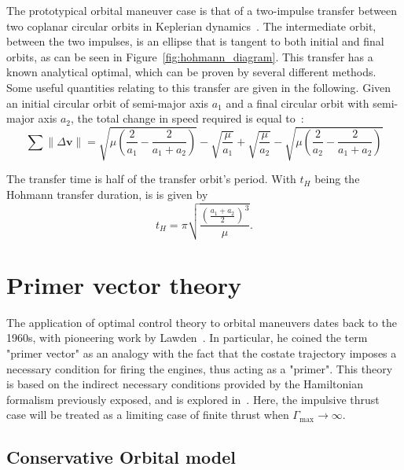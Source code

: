 The prototypical orbital maneuver case is that of a two-impulse transfer between two coplanar circular orbits in Keplerian dynamics~\cite{chobotov}. The intermediate orbit, between the two impulses, is an ellipse that is tangent to both initial and final orbits, as can be seen in Figure~\ref{fig:hohmann_diagram}. This transfer has a known analytical optimal, which can be proven by several different methods. Some useful quantities relating to this transfer are given in the following. Given an initial circular orbit of semi-major axis \(a_1\) and a final circular orbit with semi-major axis \(a_2\), the total change in speed required is equal to~\cite{chobotov}:
\begin{equation}\label{eq:hohmann_deltav}
    \sum \lVert \Delta \mathbf{v} \rVert = \sqrt{\mu\left(\frac{2}{a_1}-\frac{2}{a_1+a_2}\right)} - \sqrt{\frac{\mu}{a_1}} + \sqrt{\frac{\mu}{a_2}} - \sqrt{\mu\left(\frac{2}{a_2}-\frac{2}{a_1+a_2}\right)}
\end{equation}

The transfer time is half of the transfer orbit's period. With \(t_H\) being the Hohmann transfer duration, is is given by~\cite{chobotov} 
\begin{equation}\label{eq:hohmann_time}
    t_H = \pi \sqrt{\frac{\left(\frac{a_1+a_2}{2}\right)^3}{\mu}}.
\end{equation}

\section{Primer vector theory}
The application of optimal control theory to orbital maneuvers dates back to the 1960s, with pioneering work by Lawden~\cite{Conway_2010}. In particular, he coined the term "primer vector"  as an analogy with the fact that the costate trajectory imposes a necessary condition for firing the engines, thus acting as a "primer". This theory is based on the indirect necessary conditions provided by the Hamiltonian formalism previously exposed, and is explored in~. Here, the impulsive thrust case will be treated as a limiting case of finite thrust when \(\Gamma_{\max} \rightarrow \infty\). 

\subsection{Conservative Orbital model}

